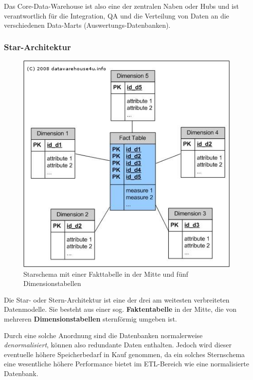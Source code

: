 \documentclass[a4paper, 11pt, nofootinbib]{article}
\begin{document}
\vspace{10px}

\noindent Das Core-Data-Warehouse ist also eine der zentralen Naben oder Hubs und ist verantwortlich für die Integration, QA und die Verteilung von Daten an die verschiedenen Data-Marts (Auswertungs-Datenbanken). 

\vspace{80px}


\subsubsection{Star-Architektur}

\begin{figure}
	\centering
	\includegraphics[keepaspectratio=true,height=16\baselineskip]{starschema.jpg}
	\caption{Starschema mit einer Fakttabelle in der Mitte und fünf Dimensionstabellen}
	\label{fig:star}
\end{figure}

Die Star- oder Stern-Architektur ist eine der drei am weitesten verbreiteten Datenmodelle. Sie besteht aus einer sog. \textbf{Faktentabelle} in der Mitte, die von mehreren \textbf{Dimensionstabellen} sternförmig umgeben ist. 

Durch eine solche Anordnung sind die Datenbanken normalerweise \textit{denormalisiert}, können also redundante Daten enthalten. Jedoch wird dieser eventuelle höhere Speicherbedarf in Kauf genommen, da ein solches Sternschema eine wesentliche höhere Performance bietet im ETL-Bereich wie eine normalisierte Datenbank.
\end{document}
